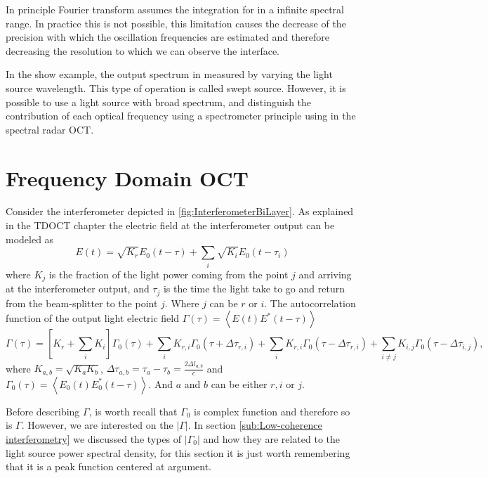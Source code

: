 \documentclass[12pt,twoside,english]{book}
\renewcommand{\~}{\perispomeni}%
\numberwithin{equation}{section}
\numberwithin{figure}{section}
\begin{document}
In principle Fourier transform assumes the integration for in a infinite spectral range. In practice this is not possible, this limitation causes the decrease of the precision with which the oscillation frequencies are estimated and therefore decreasing the resolution to which we can observe the interface.

In the show example, the output spectrum in measured by varying the light source wavelength. This type of operation is called swept source. However, it is possible to use a light source with broad spectrum, and distinguish the contribution of each optical frequency using a spectrometer principle using in the spectral radar OCT.


\section{Frequency Domain OCT}

Consider the interferometer depicted in \ref{fig:InterferometerBiLayer}. As explained in the \gls{TDOCT} chapter the electric field at the interferometer output can be modeled as
\begin{equation}
E\left(t\right)=\sqrt{K_{r}}E_{0}\left(t-\tau\right)+\sum_{i}\sqrt{K_{i}}E_{0}\left(t-\tau_{i}\right)\end{equation}
where $K_j$ is the fraction of the light power coming from the point $j$ and arriving at the interferometer output, and $\tau_j$ is the time the light take to go and return from the beam-splitter to the point $j$. Where $j$ can be $r$ or $i$. The autocorrelation function of the output light electric field $\Gamma\left(\tau\right)=\left\langle E\left(t\right)E^{*}\left(t-\tau\right)\right\rangle $
\begin{equation}
\Gamma\left(\tau\right)=\left[K_{r}+\sum_{i}K_{i}\right]\Gamma_{0}\left(\tau\right)+\sum_{i}K_{r,i}\Gamma_{0}\left(\tau+\Delta\tau_{r,i}\right)+\sum_{i}K_{r,i}\Gamma_{0}\left(\tau-\Delta\tau_{r,i}\right)+\sum_{i\ne j}K_{i,j}\Gamma_{0}\left(\tau-\Delta\tau_{i,j}\right),\label{eq:FDautocorrelation}\end{equation}
where $K_{a,b}=\sqrt{K_{a}K_{b}}$, $\Delta\tau_{a,b}=\tau_{a}-\tau_{b}=\frac{2\Delta l_{a,b}}{c}$ and $\Gamma_{0}\left(\tau\right)=\left\langle E_{0}\left(t\right)E_{0}^{*}\left(t-\tau\right)\right\rangle $. And $a$ and $b$ can be either $r,i$ or $j$.

Before describing $\Gamma$, is worth recall that $\Gamma_{0}$ is complex function and therefore so is $\Gamma$. However, we are interested on the $\left|\Gamma\right|$. In section \ref{sub:Low-coherence interferometry} we discussed the types of $\left|\Gamma_{0}\right|$ and how they are related to the light source power spectral density, for this section it is just worth remembering that it is a peak function centered at argument.
\end{document}
